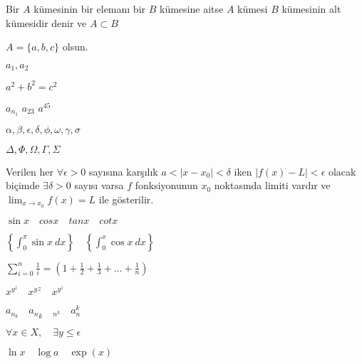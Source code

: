 \documentclass{article}
\begin{document}
Bir $A$ kümesinin bir elemanı bir $B$ kümesine aitse $A$ kümesi $B$ kümesinin alt kümesidir denir ve $A \subset B$ 

$A=\{a,b,c\}$ olsun.  

$a_1,a_2$

$a^2+b^2=c^2$

$a_{n_1}$  $a_{23}$ $a^{45}$

$\alpha, \beta, \epsilon, \delta, \phi, \omega, \gamma, \sigma$

$\Delta, \Phi, \Omega, \Gamma, \Sigma$

Verilen her $\forall \epsilon>0$ sayısına karşılık $a<|x-x_0|<\delta$ iken $|f(x)-L|<\epsilon$ olacak biçimde $\exists \delta>0$ sayısı varsa $f$ fonksiyonunun $x_0$ noktasında limiti vardır ve $\lim_{x\to x_0} f(x)=L$ ile gösterilir.

\vspace{0.5cm}
$\sin x\quad cos x\quad tan x\quad cot x$

\vspace{0.5cm}
$\displaystyle \left\{\int_0^\pi \sin x\ dx\right\} \quad \left\{\int_0^x \cos x\ dx\right\}$

\vspace{0.5cm}
$\displaystyle \sum_{i=0}^n \frac{1}{i}=\left(1+\frac{1}{2}+\frac{1}{3}+\ldots+\frac{1}{n}\right)$

\vspace{0.5cm}
$x^{y}^{z}\quad {x^y}^z\quad x^{y^z}$  

\vspace{0.5cm}
$a_{n_k} \quad {a_n}_k \quad _{n^k} \quad a_n^k$

\vspace{0.5cm}
$\forall x \in X, \quad \exists y \leq \epsilon$

\vspace{0.5cm}
$\ln x \quad \log a \quad \exp(x)$

\vspace{1cm}

\begin{Parallel}[v]{0.5\textwidth}{0.5\textwidth}
\end{Parallel}

\vspace{0.5cm} 
\begin{Parallel}[v]{0.5\textwidth}{0.5\textwidth}
\end{Parallel}
\end{document}
